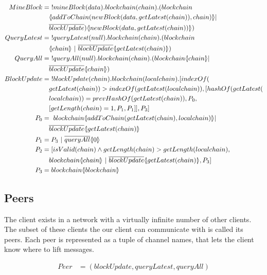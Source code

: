 \begin{align*}
    MineBlock &=\ !mineBlock(data).blockchain(chain).(blockchain\\
        &\quad \lift{}{addToChain(newBlock(data,getLatest(chain)),chain)}|\\
        &\quad \overline{blockUpdate})\lift{}{newBlock(data, getLatest(chain))})\\
    QueryLatest &=\ !queryLatest(null).blockchain(chain).(blockchain\\
        &\quad \lift{}{chain}\ |\ \overline{blockUpdate}\lift{}{getLatest(chain)})\\
        QueryAll &=\ !queryAll(null).blockchain(chain).(blockchain\lift{}{chain}|\\
        &\quad \overline{blockUpdate}\lift{}{chain})\\
    BlockUpdate &=\ !blockUpdate(chain).blockchain(localchain).[indexOf(\\
        &\quad getLatest(chain))>indexOf(getLatest(localchain)),[hashOf(getLatest(\\
        &\quad localchain))=prevHashOf(getLatest(chain)),P_0,\\
        &\quad [getLength(chain)=1,P_1,P_1]],P_3]\\
    P_0 &=\ blockchain\lift{}{addToChain(getLatest(chain),localchain)}|\\
        &\quad \overline{blockUpdate}\lift{}{getLatest(chain)}\\
    P_1 &= P_3\ |\ \overline{queryAll}\lift{}{0}\\
    P_2 &= [isValid(chain) \land getLength(chain) > getLength(localchain),\\
        &\quad blockchain\lift{}{chain}\ |\ \overline{blockUpdate}\lift{}{getLatest(chain)},P_3]\\
    P_3 &= blockchain\lift{}{blockchain}
\end{align*}

\subsection{Peers}
The client exists in a network with a virtually infinite number of other clients.
The subset of these clients the our client can communicate with is called its peers.
Each peer is represented as a tuple of channel names, that lets the client know where to lift messages.

\begin{align*}
    Peer &= (blockUpdate, queryLatest, queryAll)
\end{align*}

